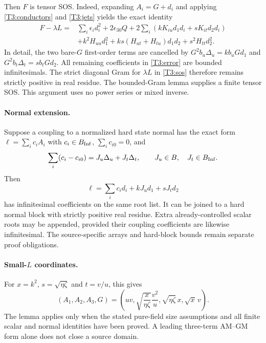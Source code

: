 Then $F$ is tensor SOS. Indeed, expanding $A_i=G+d_i$ and applying
\eqref{T3:conductors} and \eqref{T3:jets} yields the exact identity
\begin{align}\label{T3:error}
 F-\lambda L={}&\sum_i\epsilon_i d_i^2+2\epsilon_{30}Q
 +2\sum_i(kK_{iu}d_1d_i+sK_{it}d_2d_i)\\
 &+k^2H_{uu}d_1^2+ks(H_{ut}+H_{tu})d_1d_2
          +s^2H_{tt}d_2^2.\nonumber
\end{align}
In detail, the two bare-$G$ first-order terms are cancelled by
$G^2b_u\Delta_u=kb_uGd_1$ and
$G^2b_t\Delta_t=sb_tGd_2$. All remaining coefficients in
\eqref{T3:error} are bounded infinitesimals. The strict diagonal
Gram for $\lambda L$ in \eqref{T3:sos} therefore remains strictly
positive in real residue. The bounded-Gram lemma supplies a finite
tensor SOS. This argument uses no power series or mixed inverse.

\paragraph{Normal extension.}
Suppose a coupling to a normalized hard state normal has the exact form
$\ell=\sum_i c_iA_i$ with $c_i\in B_{\rm Inf}$,
$\sum_i c_{i0}=0$, and
\[
 \sum_i(c_i-c_{i0})=J_u\Delta_u+J_t\Delta_t,
 \qquad J_u\in B,\quad J_t\in B_{\rm Inf}.
\]
Then
\[
 \ell=\sum_i c_i d_i+kJ_u d_1+sJ_t d_2
\]
has infinitesimal coefficients on the same root list. It can be joined
to a hard normal block with strictly positive real residue. Extra
already-controlled scalar roots may be appended, provided their
coupling coefficients are likewise infinitesimal. The source-specific
arrays and hard-block bounds remain separate proof obligations.

\paragraph{Small-$L$ coordinates.}
For $x=k^2$, $s=\sqrt{\eta\zeta}$ and $t=v/u$, this gives
\[
 (A_1,A_2,A_3,G)=
 \left(uv,\sqrt{\frac{x}{\eta\zeta}}\frac{v^2}{u},
       \sqrt{\eta\zeta}\,x,\sqrt{x}\,v\right).
\]
The lemma applies only when the stated pure-field size assumptions and
all finite scalar and normal identities have been proved. A leading
three-term AM--GM form alone does not close a source domain.
